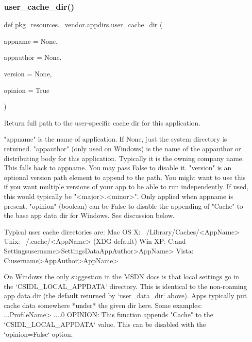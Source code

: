 \subsubsection{\texorpdfstring{user\+\_\+cache\+\_\+dir()}{user\_cache\_dir()}}
{\footnotesize\ttfamily def pkg\+\_\+resources.\+\_\+vendor.\+appdirs.\+user\+\_\+cache\+\_\+dir (\begin{DoxyParamCaption}\item[{}]{appname = {\ttfamily None},  }\item[{}]{appauthor = {\ttfamily None},  }\item[{}]{version = {\ttfamily None},  }\item[{}]{opinion = {\ttfamily True} }\end{DoxyParamCaption})}

\begin{DoxyVerb}Return full path to the user-specific cache dir for this application.

    "appname" is the name of application.
        If None, just the system directory is returned.
    "appauthor" (only used on Windows) is the name of the
        appauthor or distributing body for this application. Typically
        it is the owning company name. This falls back to appname. You may
        pass False to disable it.
    "version" is an optional version path element to append to the
        path. You might want to use this if you want multiple versions
        of your app to be able to run independently. If used, this
        would typically be "<major>.<minor>".
        Only applied when appname is present.
    "opinion" (boolean) can be False to disable the appending of
        "Cache" to the base app data dir for Windows. See
        discussion below.

Typical user cache directories are:
    Mac OS X:   ~/Library/Caches/<AppName>
    Unix:       ~/.cache/<AppName> (XDG default)
    Win XP:     C:\Documents and Settings\<username>\Local Settings\Application Data\<AppAuthor>\<AppName>\Cache
    Vista:      C:\Users\<username>\AppData\Local\<AppAuthor>\<AppName>\Cache

On Windows the only suggestion in the MSDN docs is that local settings go in
the `CSIDL_LOCAL_APPDATA` directory. This is identical to the non-roaming
app data dir (the default returned by `user_data_dir` above). Apps typically
put cache data somewhere *under* the given dir here. Some examples:
    ...\Mozilla\Firefox\Profiles\<ProfileName>\Cache
    ...\Acme\SuperApp\Cache\1.0
OPINION: This function appends "Cache" to the `CSIDL_LOCAL_APPDATA` value.
This can be disabled with the `opinion=False` option.
\end{DoxyVerb}
 \mbox{\label{namespacepkg__resources_1_1__vendor_1_1appdirs_a30f0cf6e4ca4ce5a3b7d3c58e5049f05}} 
